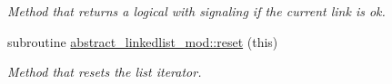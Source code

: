 \begin{DoxyCompactItemize}
\begin{DoxyCompactList}\small\item\em Method that returns a logical with signaling if the current link is ok. \end{DoxyCompactList}\item 
subroutine \mbox{\hyperlink{namespaceabstract__linkedlist__mod_a46ff8b8a3ab81610eb47d72d742778c3}{abstract\+\_\+linkedlist\+\_\+mod\+::reset}} (this)
\begin{DoxyCompactList}\small\item\em Method that resets the list iterator. \end{DoxyCompactList}\end{DoxyCompactItemize}

